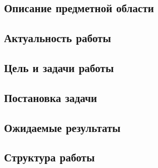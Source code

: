 \subsection{Описание предметной области}

\subsection{Актуальность работы}

\subsection{Цель и задачи работы}

\subsection{Постановка задачи}

\subsection{Ожидаемые результаты}

\subsection{Структура работы}